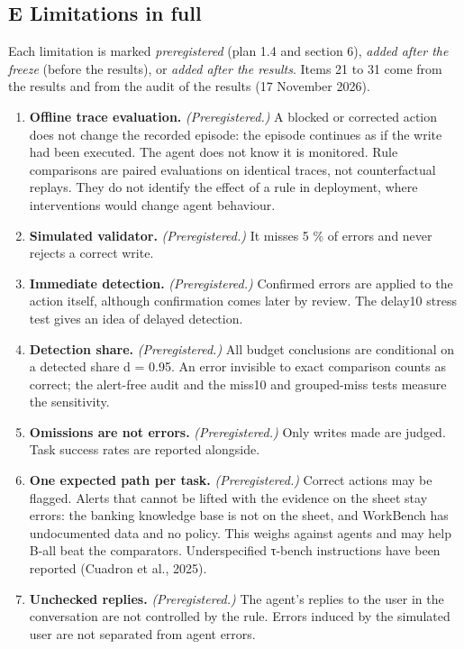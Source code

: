 \subsection{E Limitations in full}\label{e-limitations-in-full}

Each limitation is marked \emph{preregistered} (plan 1.4 and section 6), \emph{added after the freeze} (before the results), or \emph{added after the results}. Items 21 to 31 come from the results and from the audit of the results (17 November 2026).

\begin{enumerate}
\def\labelenumi{\arabic{enumi}.}
\tightlist
\item
  \textbf{Offline trace evaluation.} \emph{(Preregistered.)} A blocked or corrected action does not change the recorded episode: the episode continues as if the write had been executed. The agent does not know it is monitored. Rule comparisons are paired evaluations on identical traces, not counterfactual replays. They do not identify the effect of a rule in deployment, where interventions would change agent behaviour.
\item
  \textbf{Simulated validator.} \emph{(Preregistered.)} It misses 5 \% of errors and never rejects a correct write.
\item
  \textbf{Immediate detection.} \emph{(Preregistered.)} Confirmed errors are applied to the action itself, although confirmation comes later by review. The delay10 stress test gives an idea of delayed detection.
\item
  \textbf{Detection share.} \emph{(Preregistered.)} All budget conclusions are conditional on a detected share d = 0.95. An error invisible to exact comparison counts as correct; the alert-free audit and the miss10 and grouped-miss tests measure the sensitivity.
\item
  \textbf{Omissions are not errors.} \emph{(Preregistered.)} Only writes made are judged. Task success rates are reported alongside.
\item
  \textbf{One expected path per task.} \emph{(Preregistered.)} Correct actions may be flagged. Alerts that cannot be lifted with the evidence on the sheet stay errors: the banking knowledge base is not on the sheet, and WorkBench has undocumented data and no policy. This weighs against agents and may help B-all beat the comparators. Underspecified τ-bench instructions have been reported (Cuadron et al., 2025).
\item
  \textbf{Unchecked replies.} \emph{(Preregistered.)} The agent's replies to the user in the conversation are not controlled by the rule. Errors induced by the simulated user are not separated from agent errors.

\end{enumerate}
